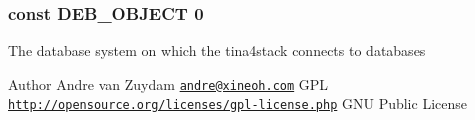 \subsubsection[{D\+E\+B\+\_\+\+O\+B\+J\+E\+C\+T}]{\setlength{\rightskip}{0pt plus 5cm}const D\+E\+B\+\_\+\+O\+B\+J\+E\+C\+T 0}\label{Debby_8php_acaf4f00f16a383f146403a31dccd06c1}
The database system on which the tina4stack connects to databases

\begin{DoxyAuthor}{Author}
Andre van Zuydam \href{mailto:andre@xineoh.com}{\tt andre@xineoh.\+com}  G\+P\+L  \href{http://opensource.org/licenses/gpl-license.php}{\tt http\+://opensource.\+org/licenses/gpl-\/license.\+php} G\+N\+U Public License 
\end{DoxyAuthor}

